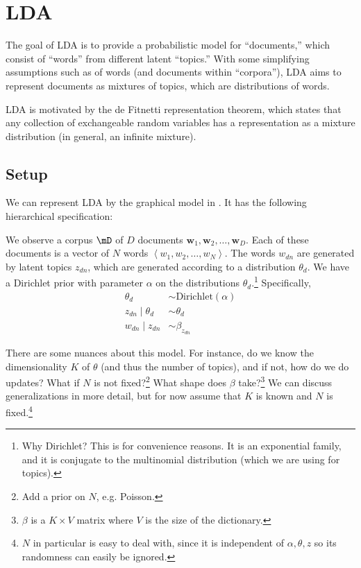 \section{LDA}
The goal of LDA is to provide a probabilistic model for ``documents,'' which consist of ``words'' from different latent ``topics.'' With some simplifying assumptions such as  of words (and documents within ``corpora''), LDA aims to represent documents as mixtures of topics, which are distributions of words.

\begin{remark}
    LDA is motivated by the de Fitnetti representation theorem, which states that any collection of exchangeable random variables has a representation as a mixture distribution (in general, an infinite mixture).
\end{remark}
\subsection{Setup}
We can represent LDA by the graphical model in . It has the following hierarchical specification:
\begin{itemize}
    \ii We observe a corpus $\mD$ of $D$ documents 
    $\mathbf{w}_1,\mathbf{w}_2, \ldots, \mathbf{w}_D$.
    \ii Each of these documents is a vector of $N$ words $\left\langle w_1, w_2, \ldots, w_N \right\rangle$.
    \ii The words $w_{dn}$ are generated by latent topics $z_{dn}$, which are generated according to a distribution $\theta_d$. We have a Dirichlet prior with parameter $\alpha$ on the distributions $\theta_d$.\footnote{Why Dirichlet? This is for convenience reasons. It is an exponential family, and it is conjugate to the multinomial distribution (which we are using for topics).} Specifically,
    \begin{align*}
        \theta_d &\sim \text{Dirichlet}(\alpha)\\
        z_{dn} \mid \theta_d &\sim \theta_d\\
        w_{dn} \mid z_{dn}&\sim \beta_{z_{dn}}
    \end{align*}
\end{itemize}
There are some nuances about this model. For instance, do we know the dimensionality $K$ of $\theta$ (and thus the number of topics), and if not, how do we do updates? What if $N$ is not fixed?\footnote{Add a prior on $N$, e.g. Poisson.} What shape does $\beta$ take?\footnote{$\beta$ is a $K \times V$ matrix where $V$ is the size of the dictionary.} We can discuss generalizations in more detail, but for now assume that $K$ is known and $N$ is fixed.\footnote{$N$ in particular is easy to deal with, since it is independent of $\alpha, \theta, z$ so its randomness can easily be ignored.}

